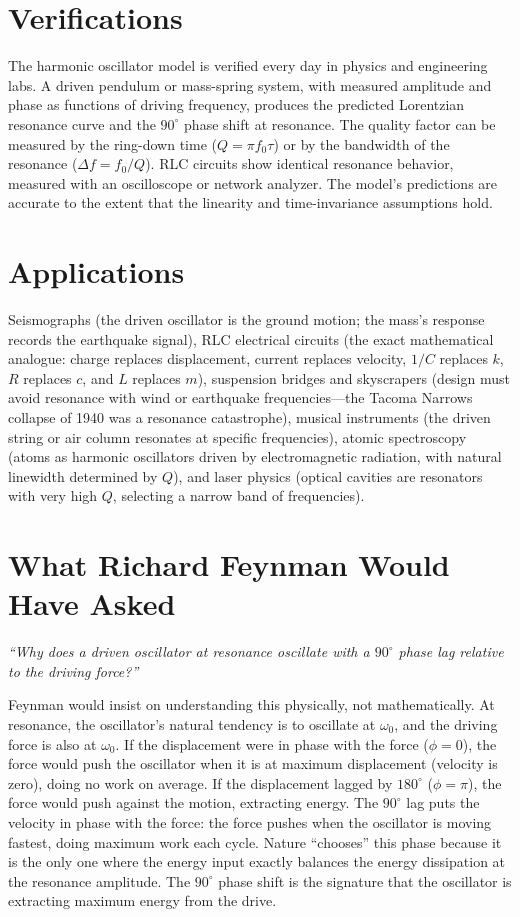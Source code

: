 \section*{Verifications}

The harmonic oscillator model is verified every day in physics and engineering labs. A driven pendulum or mass-spring system, with measured amplitude and phase as functions of driving frequency, produces the predicted Lorentzian resonance curve and the $90^\circ$ phase shift at resonance. The quality factor can be measured by the ring-down time ($Q = \pi f_0\tau$) or by the bandwidth of the resonance ($\Delta f = f_0/Q$). RLC circuits show identical resonance behavior, measured with an oscilloscope or network analyzer. The model's predictions are accurate to the extent that the linearity and time-invariance assumptions hold.
\section*{Applications}

Seismographs (the driven oscillator is the ground motion; the mass's response records the earthquake signal), RLC electrical circuits (the exact mathematical analogue: charge replaces displacement, current replaces velocity, $1/C$ replaces $k$, $R$ replaces $c$, and $L$ replaces $m$), suspension bridges and skyscrapers (design must avoid resonance with wind or earthquake frequencies---the Tacoma Narrows collapse of 1940 was a resonance catastrophe), musical instruments (the driven string or air column resonates at specific frequencies), atomic spectroscopy (atoms as harmonic oscillators driven by electromagnetic radiation, with natural linewidth determined by $Q$), and laser physics (optical cavities are resonators with very high $Q$, selecting a narrow band of frequencies).
\section*{What Richard Feynman Would Have Asked}

\textit{``Why does a driven oscillator at resonance oscillate with a $90^\circ$ phase lag relative to the driving force?''}

Feynman would insist on understanding this physically, not mathematically. At resonance, the oscillator's natural tendency is to oscillate at $\omega_0$, and the driving force is also at $\omega_0$. If the displacement were in phase with the force ($\phi = 0$), the force would push the oscillator when it is at maximum displacement (velocity is zero), doing no work on average. If the displacement lagged by $180^\circ$ ($\phi = \pi$), the force would push against the motion, extracting energy. The $90^\circ$ lag puts the velocity in phase with the force: the force pushes when the oscillator is moving fastest, doing maximum work each cycle. Nature ``chooses'' this phase because it is the only one where the energy input exactly balances the energy dissipation at the resonance amplitude. The $90^\circ$ phase shift is the signature that the oscillator is extracting maximum energy from the drive.

